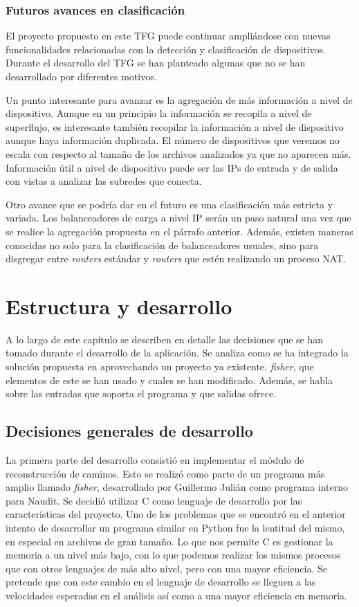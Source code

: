 \documentclass[tfg,epsbased,lof,lot,loa,covers,final,copyright,overleaf]{tfgtfmthesisuam}
\begin{document}
\subsection{Futuros avances en clasificación}
\label{subsec:Analisis:Dispositivos:Futuro}
El proyecto propuesto en este TFG puede continuar ampliándose con nuevas funcionalidades relacionadas con la detección y clasificación de dispositivos. Durante el desarrollo del TFG se han planteado algunas que no se han desarrollado por diferentes motivos.

Un punto interesante para avanzar es la agregación de más información a nivel de dispositivo. Aunque en un principio la información se recopila a nivel de superflujo, es interesante también recopilar la información a nivel de dispositivo aunque haya información duplicada. El número de dispositivos que veremos no escala con respecto al tamaño de los archivos analizados ya que no aparecen más. Información útil a nivel de dispositivo puede ser las IPs de entrada y de salida con vistas a analizar las subredes que conecta.

Otro avance que se podría dar en el futuro es una clasificación más estricta y variada. Los balanceadores de carga a nivel IP serán un paso natural una vez que se realice la agregación propuesta en el párrafo anterior. Además, existen maneras conocidas no solo para la clasificación de balanceadores usuales, sino para disgregar entre \textit{routers} estándar y \textit{routers} que estén realizando un proceso NAT.

\chapter{Estructura y desarrollo}
\label{chap:Desarrollo}
A lo largo de este capítulo se describen en detalle las decisiones que se han tomado durante el desarrollo de la aplicación. Se analiza como se ha integrado la solución propuesta en aprovechando un proyecto ya existente, \textit{fisher}, que elementos de este se han usado y cuales se han modificado. Además, se habla sobre las entradas que soporta el programa y que salidas ofrece.

\section{Decisiones generales de desarrollo}
La primera parte del desarrollo consistió en implementar el módulo de reconstrucción de caminos. Esto se realizó como parte de un programa más amplio llamado \textit{fisher}, desarrollado por Guillermo Julián como programa interno para Naudit. Se decidió utilizar C como lenguaje de desarrollo por las características del proyecto. Uno de los problemas que se encontró en el anterior intento de desarrollar un programa similar en Python fue la lentitud del mismo, en especial en archivos de gran tamaño. Lo que nos permite C es gestionar la memoria a un nivel más bajo, con lo que podemos realizar los mismos procesos que con otros lenguajes de más alto nivel, pero con una mayor eficiencia. Se pretende que con este cambio en el lenguaje de desarrollo se lleguen a las velocidades esperadas en el análisis así como a una mayor eficiencia en memoria.
\end{document}
